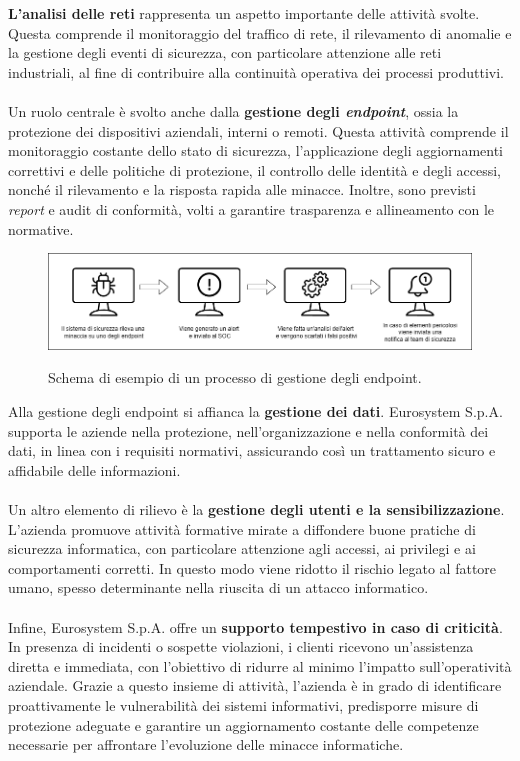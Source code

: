 \textbf{L'analisi delle reti} rappresenta un aspetto importante delle attività svolte. Questa comprende il monitoraggio del traffico di rete, il rilevamento di anomalie e la gestione degli eventi di sicurezza, con particolare attenzione alle reti industriali, al fine di contribuire alla continuità operativa dei processi produttivi.\\\\  
Un ruolo centrale è svolto anche dalla \textbf{gestione degli \textit{endpoint}}, ossia la protezione dei dispositivi aziendali, interni o remoti. Questa attività comprende il monitoraggio costante dello stato di sicurezza, l'applicazione degli aggiornamenti correttivi e delle politiche di protezione, il controllo delle identità e degli accessi, nonché il rilevamento e la risposta rapida alle minacce. Inoltre, sono previsti \textit{report} e \gls{audit} di conformità, volti a garantire trasparenza e allineamento con le normative.  
\begin{figure}[H]
    \centering
    \includegraphics[alt={Schema Endpoint governance}, width=\columnwidth]{img/endpoint.png}
    \caption{Schema di esempio di un processo di gestione degli endpoint.}
    \label{fig:endpoint_governance}    
\end{figure}  
Alla gestione degli endpoint si affianca la \textbf{gestione dei dati}. Eurosystem S.p.A. supporta le aziende nella protezione, nell'organizzazione e nella conformità dei dati, in linea con i requisiti normativi, assicurando così un trattamento sicuro e affidabile delle informazioni.\\\\  
Un altro elemento di rilievo è la \textbf{gestione degli utenti e la sensibilizzazione}. L'azienda promuove attività formative mirate a diffondere buone pratiche di sicurezza informatica, con particolare attenzione agli accessi, ai privilegi e ai comportamenti corretti. In questo modo viene ridotto il rischio legato al fattore umano, spesso determinante nella riuscita di un attacco informatico.\\\\  
Infine, Eurosystem S.p.A. offre un \textbf{supporto tempestivo in caso di criticità}. In presenza di incidenti o sospette violazioni, i clienti ricevono un'assistenza diretta e immediata, con l'obiettivo di ridurre al minimo l'impatto sull'operatività aziendale.  
Grazie a questo insieme di attività, l'azienda è in grado di identificare proattivamente le vulnerabilità dei sistemi informativi, predisporre misure di protezione adeguate e garantire un aggiornamento costante delle competenze necessarie per affrontare l'evoluzione delle minacce informatiche.  

